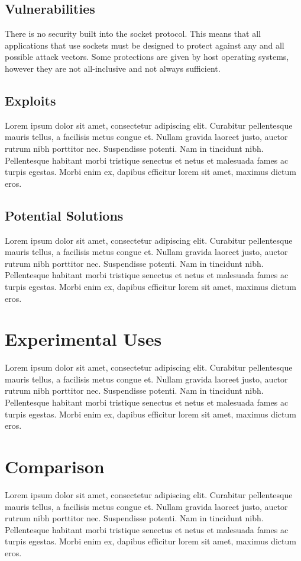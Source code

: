 \documentclass[conference, 12pt]{IEEEtran}
\begin{document}
\subsection{Vulnerabilities}
There is no security built into the socket protocol. This means that all applications that use sockets must be designed to protect against any and all possible attack vectors. Some protections are given by host operating systems, however they are not all-inclusive and not always sufficient.

\subsection{Exploits}
Lorem ipsum dolor sit amet, consectetur adipiscing elit. Curabitur pellentesque mauris tellus, a facilisis metus congue et. Nullam gravida laoreet justo, auctor rutrum nibh porttitor nec. Suspendisse potenti. Nam in tincidunt nibh. Pellentesque habitant morbi tristique senectus et netus et malesuada fames ac turpis egestas. Morbi enim ex, dapibus efficitur lorem sit amet, maximus dictum eros. 

\subsection{Potential Solutions}
Lorem ipsum dolor sit amet, consectetur adipiscing elit. Curabitur pellentesque mauris tellus, a facilisis metus congue et. Nullam gravida laoreet justo, auctor rutrum nibh porttitor nec. Suspendisse potenti. Nam in tincidunt nibh. Pellentesque habitant morbi tristique senectus et netus et malesuada fames ac turpis egestas. Morbi enim ex, dapibus efficitur lorem sit amet, maximus dictum eros. 

\section{Experimental Uses}
Lorem ipsum dolor sit amet, consectetur adipiscing elit. Curabitur pellentesque mauris tellus, a facilisis metus congue et. Nullam gravida laoreet justo, auctor rutrum nibh porttitor nec. Suspendisse potenti. Nam in tincidunt nibh. Pellentesque habitant morbi tristique senectus et netus et malesuada fames ac turpis egestas. Morbi enim ex, dapibus efficitur lorem sit amet, maximus dictum eros. 

\section{Comparison}
Lorem ipsum dolor sit amet, consectetur adipiscing elit. Curabitur pellentesque mauris tellus, a facilisis metus congue et. Nullam gravida laoreet justo, auctor rutrum nibh porttitor nec. Suspendisse potenti. Nam in tincidunt nibh. Pellentesque habitant morbi tristique senectus et netus et malesuada fames ac turpis egestas. Morbi enim ex, dapibus efficitur lorem sit amet, maximus dictum eros. 
\end{document}
